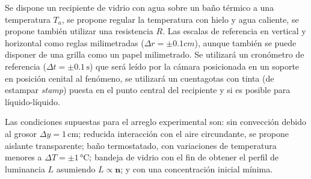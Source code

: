\documentclass[11pt]{article}
\begin{document}
Se dispone un recipiente de vidrio con agua sobre un baño térmico a una temperatura $T_a$, se propone regular la temperatura con hielo y agua caliente, se propone también utilizar una resistencia $R$. Las escalas de referencia en vertical y horizontal como reglas milimetradas ($\Delta r = \pm 0.1 cm$), aunque también se puede disponer de una grilla como un papel milimetrado. Se utilizará un cronómetro de referencia ($\Delta t = \pm 0.1 \, \unit{\second}$) que será leído por la cámara posicionada en un soporte en posición cenital al fenómeno, se utilizará un cuentagotas con tinta (de estampar \textit{stamp}) puesta en el punto central del recipiente y si es posible para líquido-líquido.

Las condiciones supuestas para el arreglo experimental son: sin convección debido al grosor $\Delta y= 1 \, \unit{\centi\meter}$; reducida interacción con el aire circundante, se propone aislante transparente; baño termostatado, con variaciones de temperatura menores a $\Delta T = \pm 1 \, \unit{\celsius}$; bandeja de vidrio con el fin de obtener el perfil de luminancia $L$ asumiendo $L \propto \mathbf{n}$; y con una concentración inicial mínima.
\end{document}
